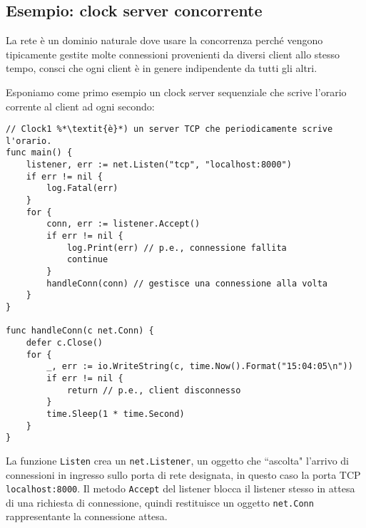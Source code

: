 \documentclass[../../thesis.tex]{subfiles}
\begin{document}
    \subsection{Esempio: clock server concorrente}\label{subsec:esempio:-clock-server-concorrente}
    La rete è un dominio naturale dove usare la concorrenza perché vengono tipicamente gestite molte connessioni provenienti da diversi client allo stesso tempo, consci che ogni client è in genere indipendente da tutti gli altri.
    \hfill \vspace{12pt}

    Esponiamo come primo esempio un clock server sequenziale che scrive l'orario corrente al client ad ogni secondo:
    \begin{lstlisting}[frame = single,label={lst:lstlisting7-2.1}]
// Clock1 %*\textit{è}*) un server TCP che periodicamente scrive l'orario.
func main() {
    listener, err := net.Listen("tcp", "localhost:8000")
    if err != nil {
        log.Fatal(err)
    }
    for {
        conn, err := listener.Accept()
        if err != nil {
            log.Print(err) // p.e., connessione fallita
            continue
        }
        handleConn(conn) // gestisce una connessione alla volta
    }
}

func handleConn(c net.Conn) {
    defer c.Close()
    for {
        _, err := io.WriteString(c, time.Now().Format("15:04:05\n"))
        if err != nil {
            return // p.e., client disconnesso 
        }
        time.Sleep(1 * time.Second)
    }
}
    \end{lstlisting}
    La funzione \verb"Listen" crea un \verb"net.Listener", un oggetto che ``ascolta" l'arrivo di connessioni in ingresso sullo porta di rete designata, in questo caso la porta TCP \verb"localhost:8000".
    Il metodo \verb"Accept" del listener blocca il listener stesso in attesa di una richiesta di connessione, quindi restituisce un oggetto \verb"net.Conn" rappresentante la connessione attesa.
    \hfill \vspace{12pt}
\end{document}
